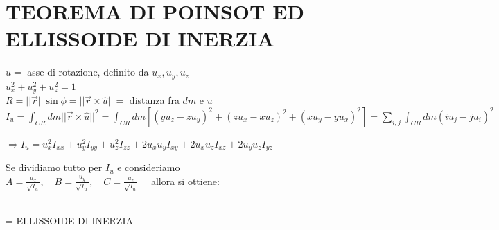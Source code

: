 \documentclass[12pt]{article}
\begin{document}
\section*{TEOREMA DI POINSOT ED ELLISSOIDE DI INERZIA}

\begin{minipage}{0.3\textwidth}
\end{minipage}
\begin{minipage}{0.65\textwidth}
$\hat{u} = $ asse di rotazione, definito da $u_x, u_y, u_z$ \\
$u_x^2 + u_y^2 + u_z^2 = 1$ \\[0.2cm]
$R = ||\vec{r}|| \sin\phi = ||\vec{r} \times \hat{u}|| = $ distanza fra $dm$ e $u$ \\[0.2cm]
$I_u = \int_{CR} dm ||\vec{r} \times \hat{u}||^2 = \int_{CR} dm \left[ (y u_z - z u_y)^2 + (z u_x - x u_z)^2 + (x u_y - y u_x)^2 \right] = \sum_{i,j} \int_{CR} dm (i u_j - j u_i)^2$
\end{minipage}

\vspace{0.5cm}
\noindent $\Rightarrow I_u = u_x^2 I_{xx} + u_y^2 I_{yy} + u_z^2 I_{zz} + 2 u_x u_y I_{xy} + 2 u_x u_z I_{xz} + 2 u_y u_z I_{yz}$

\vspace{0.5cm}
\noindent Se dividiamo tutto per $I_u$ e consideriamo \\
$A = \frac{u_x}{\sqrt{I_u}}, \quad B = \frac{u_y}{\sqrt{I_u}}, \quad C = \frac{u_z}{\sqrt{I_u}} \quad$ allora si ottiene:

\vspace{0.3cm}
 \\
= ELLISSOIDE DI INERZIA
\end{document}
